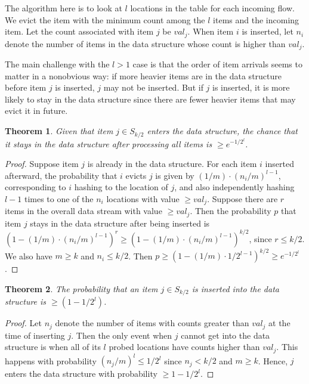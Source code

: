 \documentclass[10pt]{article}
\newtheorem{theorem}{Theorem}[section]
\begin{document}
The algorithm here is to look at $l$ locations in the table for each incoming
flow. We evict the item with the minimum count among the $l$ items and the
incoming item. Let the count associated with item $j$ be $val_j$. When item $i$
is inserted, let $n_i$ denote the number of items in the data structure whose
count is higher than $val_j$.

The main challenge with the $l > 1$ case is that the order of item arrivals
seems to matter in a nonobvious way: if more heavier items are in the data
structure before item $j$ is inserted, $j$ may not be inserted. But if $j$ is
inserted, it is more likely to stay in the data structure since there are fewer
heavier items that may evict it in future.

\begin{theorem}
  \label{thm:staying-after-entering}
  Given that item $j \in S_{k/2}$ enters the data structure, the chance that it
  stays in the data structure after processing all items is $\geq e^{-1/2^l}$.
\end{theorem}
\begin{proof}
  Suppose item $j$ is already in the data structure. For each item $i$ inserted
  afterward, the probability that $i$ evicts $j$ is given by $(1/m) \cdot
  (n_i/m)^{l-1}$, corresponding to $i$ hashing to the location of $j$, and also
  independently hashing $l-1$ times to one of the $n_i$ locations with value
  $\geq val_j$. Suppose there are $r$ items in the overall data stream with
  value $\geq val_j$. Then the probability $p$ that item $j$ stays in the data
  structure after being inserted is $(1 - (1/m) \cdot (n_i/m)^{l-1})^r \geq (1 -
  (1/m) \cdot (n_i/m)^{l-1})^{k/2}$, since $r \leq k/2$.  We also have $m \geq
  k$ and $n_i \leq k/2$. Then $p \geq (1 - (1/m) \cdot 1/2^{l-1})^{k/2} \geq
  e^{-1/2^l}$.
\end{proof}

\begin{theorem}
  \label{thm:entering-the-ds}
  The probability that an item $j \in S_{k/2}$ is inserted into the data
  structure is $\geq (1 - 1/2^l)$.
\end{theorem}
\begin{proof}
Let $n_j$ denote the number of items with counts greater than $val_j$ at the
time of inserting $j$. Then the only event when $j$ cannot get into the data
structure is when all of its $l$ probed locations have counts higher than
$val_j$. This happens with probability $(n_j/m)^l \leq 1/2^l$ since $n_j < k/2$
and $m \geq k$. Hence, $j$ enters the data structure with probability $\geq 1 -
1/2^l$.
\end{proof}
\end{document}
